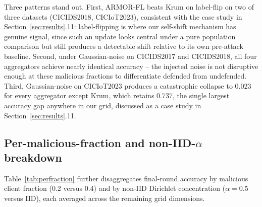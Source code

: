\documentclass[pdflatex,iicol,sn-mathphys-num]{sn-jnl}%
\theoremstyle{thmstyleone}%
\theoremstyle{thmstyletwo}%
\theoremstyle{thmstylethree}%
\begin{document}
Three patterns stand out. First, ARMOR-FL beats Krum on label-flip on two of three datasets (CICIDS2018, CICIoT2023), consistent with the case study in Section~\ref{sec:results}.11: label-flipping is where our self-shift mechanism has genuine signal, since such an update looks central under a pure population comparison but still produces a detectable shift relative to its own pre-attack baseline. Second, under Gaussian-noise on CICIDS2017 and CICIDS2018, all four aggregators achieve nearly identical accuracy -- the injected noise is not disruptive enough at these malicious fractions to differentiate defended from undefended. Third, Gaussian-noise on CICIoT2023 produces a catastrophic collapse to $0.023$ for every aggregator except Krum, which retains $0.737$, the single largest accuracy gap anywhere in our grid, discussed as a case study in Section~\ref{sec:results}.11.

\subsection{Per-malicious-fraction and non-IID-$\alpha$ breakdown}\label{sec:perfraction}

Table~\ref{tab:perfraction} further disaggregates final-round accuracy by malicious client fraction (0.2 versus 0.4) and by non-IID Dirichlet concentration ($\alpha=0.5$ versus IID), each averaged across the remaining grid dimensions.
\end{document}
